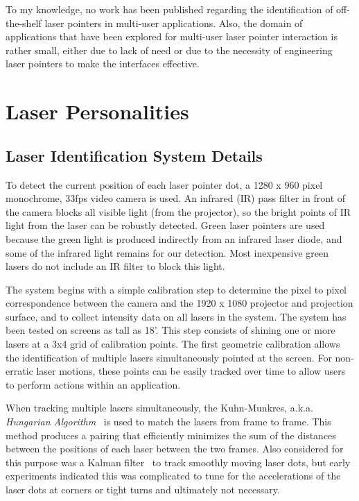 To my knowledge, no work has been published regarding the
identification of off-the-shelf laser pointers in multi-user
applications. Also, the domain of applications that have been explored
for multi-user laser pointer interaction is rather small, either due
to lack of need or due to the necessity of engineering laser pointers
to make the interfaces effective.




\section{Laser Personalities}
\label{section:LaserPersonalities}



\subsection{Laser Identification System Details}
\label{section:systemdetails}

To detect the current position of each laser pointer dot, a
1280 x 960 pixel monochrome, 33fps video camera is used.  An infrared (IR)
pass filter in front of the camera blocks all visible light (from the
projector), so the bright points of IR light
from the laser can be robustly detected. Green laser pointers are used because the
green light is produced indirectly from an infrared laser diode, and
some of the infrared light remains for our detection.  Most
inexpensive green lasers do not include an IR filter to block this
light.

The system begins with a simple
calibration step to determine the pixel to
pixel correspondence between the camera and the 1920 x 1080 projector
and 
projection surface, and to collect intensity data on all lasers in the system. The system has been tested on screens as tall as 18'.
This step consists of shining one or more lasers at a 3x4 grid of
calibration points.  The first geometric calibration
allows the identification of
multiple lasers simultaneously pointed at the screen.  For non-erratic
laser motions, these points can be easily tracked over time to allow
users to perform actions within an application.

When tracking multiple lasers simultaneously, the Kuhn-Munkres,
a.k.a. {\em Hungarian
  Algorithm}~\cite{kuhn,munkres,munkres_implementation} is used to match the
lasers from frame to frame.  This method produces a pairing that
efficiently minimizes the sum of the distances between the positions
of each laser between the two frames.  Also considered for this purpose was a
Kalman filter~\cite{Kalman} to track smoothly moving laser dots, but
early experiments indicated this was complicated to tune for the
accelerations of the laser dots at corners or tight turns and
ultimately not necessary.

